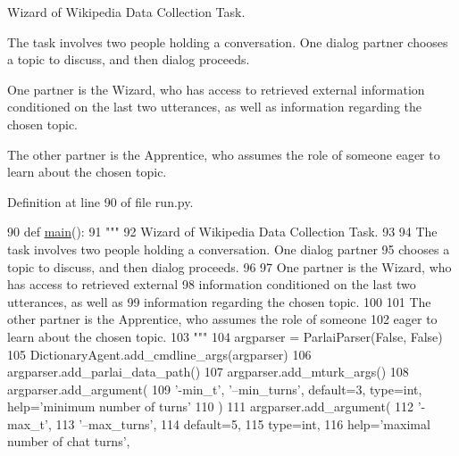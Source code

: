 \begin{DoxyVerb}Wizard of Wikipedia Data Collection Task.

The task involves two people holding a conversation. One dialog partner
chooses a topic to discuss, and then dialog proceeds.

One partner is the Wizard, who has access to retrieved external
information conditioned on the last two utterances, as well as
information regarding the chosen topic.

The other partner is the Apprentice, who assumes the role of someone
eager to learn about the chosen topic.
\end{DoxyVerb}
 

Definition at line 90 of file run.\+py.


\begin{DoxyCode}
90 \textcolor{keyword}{def }\hyperlink{namespaceprojects_1_1wizard__of__wikipedia_1_1mturk__evaluation__task_1_1run_ad3ab2c71f8083c3112815c0b363d316b}{main}():
91     \textcolor{stringliteral}{"""}
92 \textcolor{stringliteral}{    Wizard of Wikipedia Data Collection Task.}
93 \textcolor{stringliteral}{}
94 \textcolor{stringliteral}{    The task involves two people holding a conversation. One dialog partner}
95 \textcolor{stringliteral}{    chooses a topic to discuss, and then dialog proceeds.}
96 \textcolor{stringliteral}{}
97 \textcolor{stringliteral}{    One partner is the Wizard, who has access to retrieved external}
98 \textcolor{stringliteral}{    information conditioned on the last two utterances, as well as}
99 \textcolor{stringliteral}{    information regarding the chosen topic.}
100 \textcolor{stringliteral}{}
101 \textcolor{stringliteral}{    The other partner is the Apprentice, who assumes the role of someone}
102 \textcolor{stringliteral}{    eager to learn about the chosen topic.}
103 \textcolor{stringliteral}{    """}
104     argparser = ParlaiParser(\textcolor{keyword}{False}, \textcolor{keyword}{False})
105     DictionaryAgent.add\_cmdline\_args(argparser)
106     argparser.add\_parlai\_data\_path()
107     argparser.add\_mturk\_args()
108     argparser.add\_argument(
109         \textcolor{stringliteral}{'-min\_t'}, \textcolor{stringliteral}{'--min\_turns'}, default=3, type=int, help=\textcolor{stringliteral}{'minimum number of turns'}
110     )
111     argparser.add\_argument(
112         \textcolor{stringliteral}{'-max\_t'},
113         \textcolor{stringliteral}{'--max\_turns'},
114         default=5,
115         type=int,
116         help=\textcolor{stringliteral}{'maximal number of chat turns'},

\end{DoxyCode}
